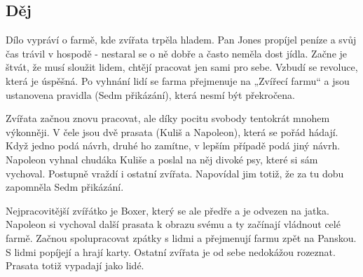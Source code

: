 \subsection*{Děj}
Dílo vypráví o farmě, kde zvířata trpěla hladem.
Pan Jones propíjel peníze a svůj čas trávil v hospodě - nestaral se o ně dobře a často neměla dost jídla.
Začne je štvát, že musí sloužit lidem, chtějí pracovat jen sami pro sebe. Vzbudí se revoluce, která je úspěšná.
Po vyhnání lidí se farma přejmenuje na „Zvířecí farmu“ a jsou ustanovena pravidla (Sedm přikázání), která nesmí být překročena.

Zvířata začnou znovu pracovat, ale díky pocitu svobody tentokrát mnohem výkonněji.
V čele jsou dvě prasata (Kuliš a Napoleon), která se pořád hádají. Když jedno podá návrh, druhé ho zamítne, v lepším případě podá jiný návrh.
Napoleon vyhnal chudáka Kuliše a poslal na něj divoké psy, které si sám vychoval.
Postupně vraždí i ostatní zvířata. Napovídal jim totiž, že za tu dobu zapomněla Sedm přikázání.

Nejpracovitější zvířátko je Boxer, který se ale předře a je odvezen na jatka.
Napoleon si vychoval další prasata k obrazu svému a ty začínají vládnout celé farmě.
Začnou spolupracovat zpátky s lidmi a přejmenují farmu zpět na Panskou. S lidmi popíjejí a hrají karty.
Ostatní zvířata je od sebe nedokážou rozeznat. Prasata totiž vypadají jako lidé.
